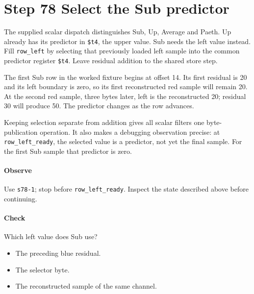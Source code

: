 \section{Step 78 Select the Sub predictor}
The supplied scalar dispatch distinguishes Sub, Up, Average and Paeth. Up already has its predictor in \texttt{\$t4}, the upper value. Sub needs the left value instead. Fill \texttt{row\_left} by selecting that previously loaded left sample into the common predictor register \texttt{\$t4}. Leave residual addition to the shared store step.

The first Sub row in the worked fixture begins at offset 14. Its first residual is 20 and its left boundary is zero, so its first reconstructed red sample will remain 20. At the second red sample, three bytes later, left is the reconstructed 20; residual 30 will produce 50. The predictor changes as the row advances.

Keeping selection separate from addition gives all scalar filters one byte-publication operation. It also makes a debugging observation precise: at \texttt{row\_left\_ready}, the selected value is a predictor, not yet the final sample. For the first Sub sample that predictor is zero.

\paragraph{Observe} Use \texttt{s78-1}; stop before \texttt{row\_left\_ready}. Inspect the state described above before continuing.

\paragraph{Check} Which left value does Sub use?
\begin{itemize}
\item[A.] The preceding blue residual.
\item[B.] The selector byte.
\item[C.] The reconstructed sample of the same channel.
\end{itemize}
